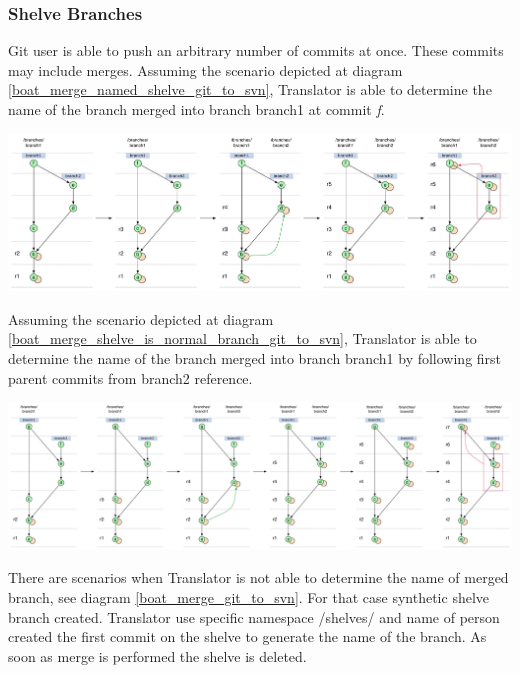 \subsubsection{Shelve Branches}

Git user is able to push an arbitrary number of commits at once. These commits may include merges. Assuming the scenario depicted at diagram \ref{boat_merge_named_shelve_git_to_svn}, Translator is able to determine the name of the branch merged into branch branch1 at commit \emph{f}.

\begin{center}
\includegraphics[width=\textwidth]{img/diagrams/boat_merge_named_shelve_git_to_svn.pdf}%
\label{boat_merge_named_shelve_git_to_svn}%
\end{center}

Assuming the scenario depicted at diagram \ref{boat_merge_shelve_is_normal_branch_git_to_svn}, Translator is able to determine the name of the branch merged into branch branch1 by following first parent commits from branch2 reference.

\begin{center}
\includegraphics[width=\textwidth]{img/diagrams/boat_merge_shelve_is_normal_branch_git_to_svn.pdf}%
\label{boat_merge_shelve_is_normal_branch_git_to_svn}%
\end{center}

There are scenarios when Translator is not able to determine the name of merged branch, see diagram \ref{boat_merge_git_to_svn}. For that case synthetic shelve branch created. Translator use specific namespace /shelves/ and name of person created the first commit on the shelve to generate the name of the branch. As soon as merge is performed the shelve is deleted.

